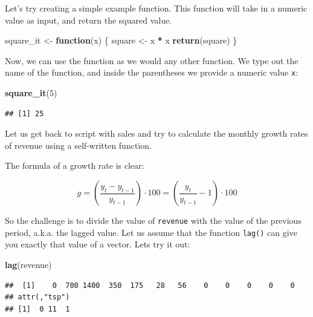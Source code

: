 \documentclass[
  12pt,
  oneside]{book}
\newenvironment{Shaded}{\begin{snugshade}}{\end{snugshade}}
\newcommand{\ControlFlowTok}[1]{\textcolor[rgb]{0.13,0.29,0.53}{\textbf{#1}}}
\newcommand{\DecValTok}[1]{\textcolor[rgb]{0.00,0.00,0.81}{#1}}
\newcommand{\FunctionTok}[1]{\textcolor[rgb]{0.13,0.29,0.53}{\textbf{#1}}}
\newcommand{\NormalTok}[1]{#1}
\newcommand{\OtherTok}[1]{\textcolor[rgb]{0.56,0.35,0.01}{#1}}
\newcommand{\SpecialCharTok}[1]{\textcolor[rgb]{0.81,0.36,0.00}{\textbf{#1}}}
\begin{document}
Let's try creating a simple example function. This function will take in a numeric value as input, and return the squared value.

\begin{Shaded}
\begin{Highlighting}[]
\NormalTok{square\_it }\OtherTok{\textless{}{-}} \ControlFlowTok{function}\NormalTok{(x) \{ }
\NormalTok{   square }\OtherTok{\textless{}{-}}\NormalTok{ x }\SpecialCharTok{*}\NormalTok{ x}
   \FunctionTok{return}\NormalTok{(square)}
\NormalTok{\} }
\end{Highlighting}
\end{Shaded}

Now, we can use the function as we would any other function. We type out the name of the function, and inside the parentheses we provide a numeric value \texttt{x}:

\begin{Shaded}
\begin{Highlighting}[]
\FunctionTok{square\_it}\NormalTok{(}\DecValTok{5}\NormalTok{)}
\end{Highlighting}
\end{Shaded}

\begin{verbatim}
## [1] 25
\end{verbatim}

Let us get back to script with sales and try to calculate the monthly growth rates of revenue using a self-written function.

The formula of a growth rate is clear:

\[ g=\left(\frac{y_t-y_{t-1}}{y_{t-1}}\right)\cdot 100=\left(\frac{y_t}{y_{t-1}}-1\right)\cdot 100 \]

So the challenge is to divide the value of \texttt{revenue} with the value of the previous period, a.k.a. the lagged value. Let us assume that the function \texttt{lag()} can give you exactly that value of a vector. Lets try it out:

\begin{Shaded}
\begin{Highlighting}[]
\FunctionTok{lag}\NormalTok{(revenue)}
\end{Highlighting}
\end{Shaded}

\begin{verbatim}
##  [1]    0  700 1400  350  175   28   56    0    0    0    0    0
## attr(,"tsp")
## [1]  0 11  1
\end{verbatim}
\end{document}
